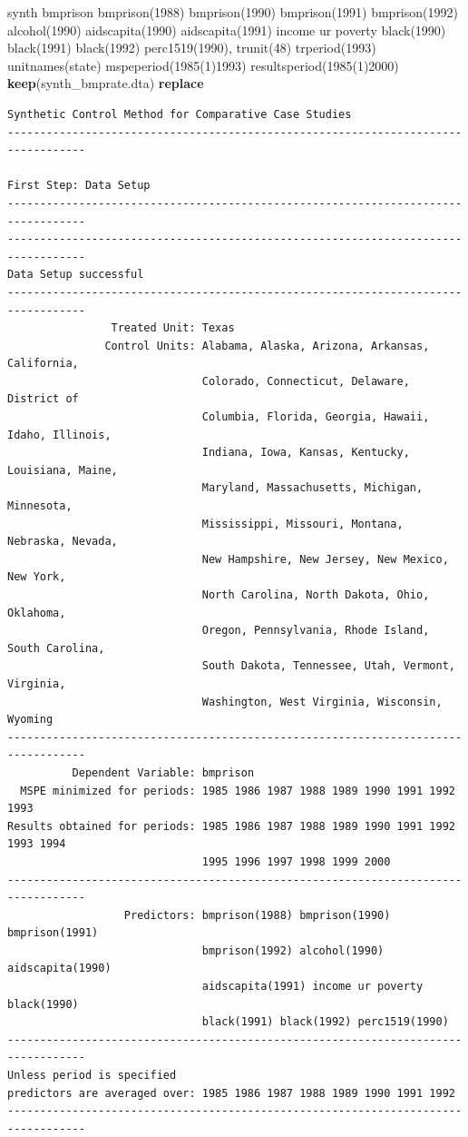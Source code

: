 \documentclass[
]{book}
\newenvironment{Shaded}{\begin{snugshade}}{\end{snugshade}}
\newcommand{\BaseNTok}[1]{\textcolor[rgb]{0.00,0.00,0.81}{#1}}
\newcommand{\KeywordTok}[1]{\textcolor[rgb]{0.13,0.29,0.53}{\textbf{#1}}}
\newcommand{\NormalTok}[1]{#1}
\begin{document}
\begin{Shaded}
\begin{Highlighting}[]
\NormalTok{synth   bmprison bmprison(1988) bmprison(1990) bmprison(1991) bmprison(1992) alcohol(1990)}
\NormalTok{aidscapita(1990) aidscapita(1991) income ur poverty }\BaseNTok{black}\NormalTok{(1990) }\BaseNTok{black}\NormalTok{(1991) }\BaseNTok{black}\NormalTok{(1992)}
\NormalTok{perc1519(1990), trunit(48) trperiod(1993) unitnames(state) mspeperiod(1985(1)1993)}
\NormalTok{resultsperiod(1985(1)2000) }\KeywordTok{keep}\NormalTok{(synth\_bmprate.dta) }\KeywordTok{replace}
\end{Highlighting}
\end{Shaded}

\begin{verbatim}
Synthetic Control Method for Comparative Case Studies
----------------------------------------------------------------------------------

First Step: Data Setup
----------------------------------------------------------------------------------
----------------------------------------------------------------------------------
Data Setup successful
----------------------------------------------------------------------------------
                Treated Unit: Texas
               Control Units: Alabama, Alaska, Arizona, Arkansas, California,
                              Colorado, Connecticut, Delaware, District of
                              Columbia, Florida, Georgia, Hawaii, Idaho, Illinois,
                              Indiana, Iowa, Kansas, Kentucky, Louisiana, Maine,
                              Maryland, Massachusetts, Michigan, Minnesota,
                              Mississippi, Missouri, Montana, Nebraska, Nevada,
                              New Hampshire, New Jersey, New Mexico, New York,
                              North Carolina, North Dakota, Ohio, Oklahoma,
                              Oregon, Pennsylvania, Rhode Island, South Carolina,
                              South Dakota, Tennessee, Utah, Vermont, Virginia,
                              Washington, West Virginia, Wisconsin, Wyoming
----------------------------------------------------------------------------------
          Dependent Variable: bmprison
  MSPE minimized for periods: 1985 1986 1987 1988 1989 1990 1991 1992 1993
Results obtained for periods: 1985 1986 1987 1988 1989 1990 1991 1992 1993 1994
                              1995 1996 1997 1998 1999 2000
----------------------------------------------------------------------------------
                  Predictors: bmprison(1988) bmprison(1990) bmprison(1991)
                              bmprison(1992) alcohol(1990) aidscapita(1990)
                              aidscapita(1991) income ur poverty black(1990)
                              black(1991) black(1992) perc1519(1990)
----------------------------------------------------------------------------------
Unless period is specified
predictors are averaged over: 1985 1986 1987 1988 1989 1990 1991 1992
----------------------------------------------------------------------------------


\end{verbatim}
\end{document}
